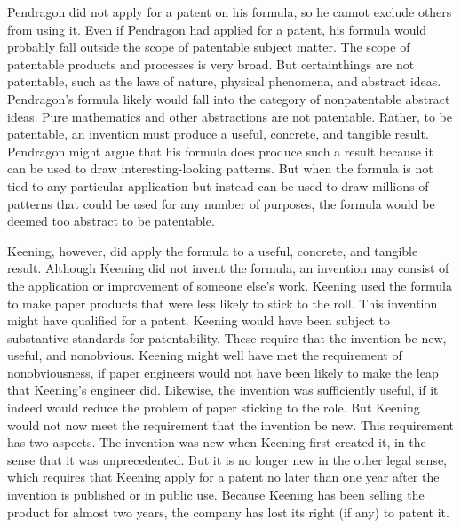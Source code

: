 \documentclass[ignorenonframetext,aspectratio=169]{beamer}
\begin{document}
\begin{frame}{}
\protect\hypertarget{section-11}{}

Pendragon did not apply for a patent on his formula, so he cannot
exclude others from using it. Even if Pendragon had applied for a
patent, his formula would probably fall outside the scope of patentable
subject matter. The scope of patentable products and processes is very
broad. But certainthings are not patentable, such as the laws of nature,
physical phenomena, and abstract ideas. Pendragon's formula likely would
fall into the category of nonpatentable abstract ideas. Pure mathematics
and other abstractions are not patentable. Rather, to be patentable, an
invention must produce a useful, concrete, and tangible result.
Pendragon might argue that his formula does produce such a result
because it can be used to draw interesting-looking patterns. But when
the formula is not tied to any particular application but instead can be
used to draw millions of patterns that could be used for any number of
purposes, the formula would be deemed too abstract to be patentable.

\end{frame}

\begin{frame}{}
\protect\hypertarget{section-12}{}

Keening, however, did apply the formula to a useful, concrete, and
tangible result. Although Keening did not invent the formula, an
invention may consist of the application or improvement of someone
else's work. Keening used the formula to make paper products that were
less likely to stick to the roll. This invention might have qualified
for a patent. Keening would have been subject to substantive standards
for patentability. These require that the invention be new, useful, and
nonobvious. Keening might well have met the requirement of
nonobviousness, if paper engineers would not have been likely to make
the leap that Keening's engineer did. Likewise, the invention was
sufficiently useful, if it indeed would reduce the problem of paper
sticking to the role. But Keening would not now meet the requirement
that the invention be new. This requirement has two aspects. The
invention was new when Keening first created it, in the sense that it
was unprecedented. But it is no longer new in the other legal sense,
which requires that Keening apply for a patent no later than one year
after the invention is published or in public use. Because Keening has
been selling the product for almost two years, the company has lost its
right (if any) to patent it.

\end{frame}
\end{document}
